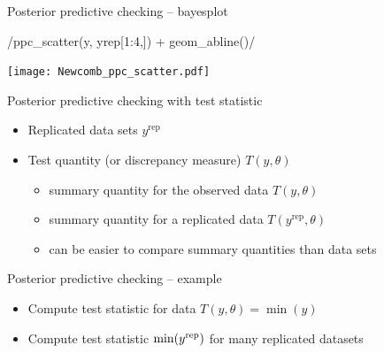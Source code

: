 \documentclass[t]{beamer}
\DeclareMathOperator{\rep}{\mathrm{rep}}
\begin{document}
\begin{frame}{Posterior predictive checking -- bayesplot}

  \vspace{-1\baselineskip}
  \rinline/ppc_scatter(y, yrep[1:4,]) + geom_abline()/
  
  \texttt{[image: Newcomb\_ppc\_scatter.pdf]}

\end{frame}

\begin{frame}{Posterior predictive checking with test statistic}

  \begin{itemize}
  \item Replicated data sets $y^{\rep}$
  \item Test quantity (or discrepancy measure) $T(y,\theta)$
    \begin{itemize}
    \item summary quantity for the observed data $T(y,\theta)$
    \item summary quantity for a replicated data $T(y^{\rep},\theta)$
    \item can be easier to compare summary quantities than data sets
    \end{itemize}
  \end{itemize}

\end{frame}

\begin{frame}{Posterior predictive checking -- example}

  \begin{itemize}
  \item<1-> Compute test statistic for data $T(y,\theta)=\min(y)$
  \item<2-> Compute test statistic $\min(y^{\rm rep})$ for many replicated datasets 
  \end{itemize}
  \vspace{-1.5\baselineskip}

\end{frame}
\end{document}
